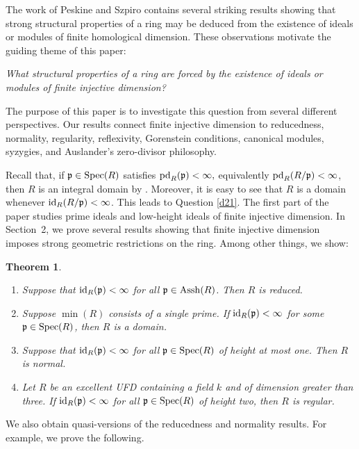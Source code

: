 \documentclass[10. pt,a4paper]{amsart}
\newtheorem{theorem}{Theorem}[section]
\theoremstyle{definition}
\theoremstyle{remark}
\newcommand{\Assh}{\operatorname{Assh}}
\newcommand{\Spec}{\operatorname{Spec}}
\newcommand{\id}{\operatorname{id}}
\newcommand{\pd}{\operatorname{pd}}
\newcommand{\fp}{\frak{p}}
\begin{document}
The work of Peskine and Szpiro contains several striking results showing that strong structural properties of a ring may be deduced from the existence of ideals or modules of finite homological dimension.  These observations motivate the guiding theme of this paper:

\begin{center}
	\emph{What structural properties of a ring are forced by the existence of ideals or modules of finite injective dimension?}
\end{center}

The purpose of this paper is to investigate this question from several different perspectives. Our results connect finite injective dimension to reducedness, normality, regularity, reflexivity, Gorenstein conditions, canonical modules, syzygies, and Auslander's zero-divisor philosophy.

\medskip
Recall that, if $\fp\in\Spec(R)$ satisfies
\(
\pd_R(\fp)<\infty,
\)
equivalently $\pd_R(R/\fp)<\infty$, then $R$ is an integral domain by \cite[Corollary II.3.3]{PS}. Moreover, it is easy to see that $R$ is a domain whenever $\id_R(R/\fp)<\infty$. This leads to {Question} \ref{d21}.
The first part of the paper studies prime ideals and low-height ideals of finite injective dimension. In Section~2, we prove several results showing that finite injective dimension imposes strong geometric restrictions on the ring. Among other things, we show:


\begin{theorem}
	\begin{enumerate}
		\item Suppose that $\id_R(\fp)<\infty$ for all $\fp\in\Assh(R)$. Then $R$ is reduced.
		
		\item Suppose $\min(R)$ consists of a single prime. If $\id_R(\fp)<\infty$ for some $\fp\in\Spec(R)$, then $R$ is a domain.
		
		\item Suppose that $\id_R(\fp)<\infty$ for all $\fp\in\Spec(R)$ of height at most one. Then $R$ is normal.
		
		\item Let $R$ be an excellent UFD containing a field $k$ and of dimension greater than three. If $\id_R(\fp)<\infty$ for all $\fp\in\Spec(R)$ of height two, then $R$ is regular.
	\end{enumerate}
\end{theorem}

We also obtain quasi-versions of the reducedness and normality results. For example, we prove the following.
\end{document}

